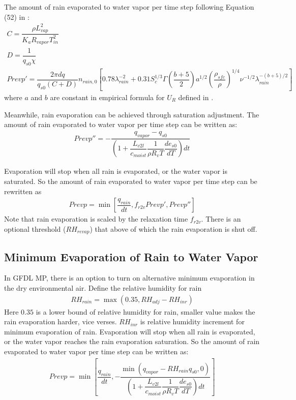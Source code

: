 \documentclass[letterpaper,titlepage,10pt]{article}
\numberwithin{equation}{section}
\begin{document}
The amount of rain evaporated to water vapor per time step following Equation (52) in \citet{lin1983bulk}:
\begin{gather}
	C = \dfrac{\rho L^2_{vap}}{K_a R_{vapor} T_{in}^2} \\
	D = \dfrac{1}{q_{s0} \chi} \\
	Prevp' = \dfrac{2 \pi dq}{q_{s0} \left(C + D \right)} n_{rain,0}
	\left[0.78 \lambda^{-2}_{rain} + 0.31 S^{1/3}_c \Gamma \left(\dfrac{b + 5}{2} \right) a^{1/2} \left(\dfrac{\rho_{sfc}}{\rho} \right)^{1/4} \nu^{-1/2} \lambda^{- (b + 5) / 2}_{rain} \right]
\end{gather}
where $a$ and $b$ are constant in empirical formula for $U_R$ defined in \citet{lin1983bulk}.

Meanwhile, rain evaporation can be achieved through saturation adjustment. The amount of rain evaporated to water vapor per time step can be written as:
\begin{gather}
	Prevp'' = - \dfrac{q_{vapor} - q_{s0}}{\left(1 + \dfrac{L_{v2l}}{c_{moist}} \dfrac{1}{\rho R_v T} \dfrac{de_{s0}}{dT} \right) dt}
\end{gather}

Evaporation will stop when all rain is evaporated, or the water vapor is saturated. So the amount of rain evaporated to water vapor per time step can be rewritten as
\begin{gather}
	Prevp = \min \left[\dfrac{q_{rain}}{dt}, f_{r2v} Prevp', Prevp'' \right]
\end{gather}
Note that rain evaporation is scaled by the relaxation time $f_{r2v}$. There is an optional threshold ($RH_{revap}$) that above of which the rain evaporation is shut off.


\subsection{Minimum Evaporation of Rain to Water Vapor}

In GFDL MP, there is an option to turn on alternative minimum evaporation in the dry environmental air. Define the relative humidity for rain
\begin{gather}
	RH_{rain} = \max \left(0.35, RH_{adj} - RH_{inr} \right)
\end{gather}
Here $0.35$ is a lower bound of relative humidity for rain, smaller value makes the rain evaporation harder, vice verses. $RH_{inr}$ is relative humidity increment for minimum evaporation of rain. Evaporation will stop when all rain is evaporated, or the water vapor reaches the rain evaporation saturation. So the amount of rain evaporated to water vapor per time step can be written as:
\begin{gather}
	Prevp = \min \left[\dfrac{q_{rain}}{dt}, - \dfrac{\min \left(q_{vapor} - RH_{rain} q_{s0}, 0 \right)}{\left(1 + \dfrac{L_{v2l}}{c_{moist}} \dfrac{1}{\rho R_v T} \dfrac{de_{s0}}{dT} \right) dt} \right]
\end{gather}
\end{document}
